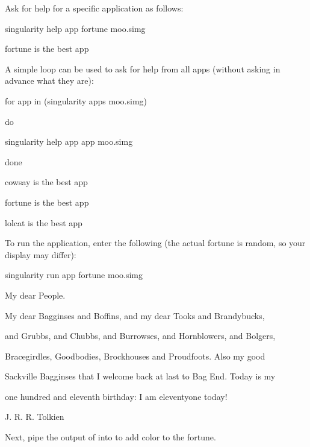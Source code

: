 \documentclass[letterpaper,10pt,english]{sphinxmanual}
\begin{document}
Ask for help for a specific application as follows:

%
\begin{sphinxVerbatim}[commandchars=\\\{\}]
singularity help \PYGZhy{}\PYGZhy{}app fortune moo.simg

fortune is the best app
\end{sphinxVerbatim}

A simple loop can be used to ask for help from all apps (without asking in advance what they are):

%
\begin{sphinxVerbatim}[commandchars=\\\{\}]
for app in \PYGZdl{}(singularity apps moo.simg)

   do

     singularity help \PYGZhy{}\PYGZhy{}app \PYGZdl{}app moo.simg

done

cowsay is the best app

fortune is the best app

lolcat is the best app
\end{sphinxVerbatim}

To run the  application, enter the following (the actual fortune is random, so your display may differ):

%
\begin{sphinxVerbatim}[commandchars=\\\{\}]
singularity run \PYGZhy{}\PYGZhy{}app fortune moo.simg

    My dear People.

    My dear Bagginses and Boffins, and my dear Tooks and Brandybucks,

and Grubbs, and Chubbs, and Burrowses, and Hornblowers, and Bolgers,

Bracegirdles, Goodbodies, Brockhouses and Proudfoots.  Also my good

Sackville Bagginses that I welcome back at last to Bag End.  Today is my

one hundred and eleventh birthday: I am eleventy\PYGZhy{}one today!\PYGZdq{}

        \PYGZhy{}\PYGZhy{} J. R. R. Tolkien
\end{sphinxVerbatim}

Next, pipe the output of  into  to add color to the fortune.
\end{document}
